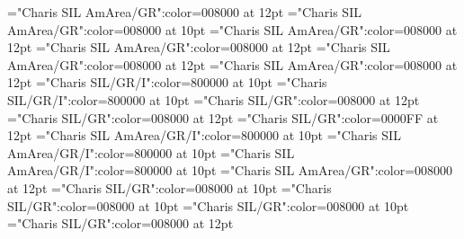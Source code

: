 \documentclass[a4paper,twoside]{article}
\begin{document}
\font\visiblevariantentryrefsminorentryvariantletDatadicBody="Charis SIL AmArea/GR":color=008000 at 12pt
\font\spanvisiblevariantentryrefsminorentryvariantletDatadicBody="Charis SIL AmArea/GR":color=008000 at 10pt
\font\visiblevariantentryrefvisiblevariantentryrefsminorentryvariantletDatadicBody="Charis SIL AmArea/GR":color=008000 at 12pt
\font\variantentrytypesvisiblevariantentryrefvisiblevariantentryrefsminorentryvariantletDatadicBody="Charis SIL AmArea/GR":color=008000 at 12pt
\font\variantentrytypevariantentrytypesvisiblevariantentryrefvisiblevariantentryrefsminorentryvariantletDatadicBody="Charis SIL AmArea/GR":color=008000 at 12pt
\font\reverseabbrvariantentrytypevariantentrytypesvisiblevariantentryrefvisiblevariantentryrefsminorentryvariantletDatadicBody="Charis SIL AmArea/GR":color=008000 at 12pt
\font\spanesreverseabbrvariantentrytypevariantentrytypesvisiblevariantentryrefvisiblevariantentryrefsminorentryvariantletDatadicBody="Charis SIL/GR/I":color=800000 at 10pt
\font\spanreverseabbrvariantentrytypevariantentrytypesvisiblevariantentryrefvisiblevariantentryrefsminorentryvariantletDatadicBody="Charis SIL/GR/I":color=800000 at 10pt
\font{}="Charis SIL/GR":color=008000 at 12pt
\font{}="Charis SIL/GR":color=008000 at 12pt
\font\headwordreferencedentryreferencedentriesvisiblevariantentryrefvisiblevariantentryrefsminorentryvariantletDatadicBody="Charis SIL/GR":color=0000FF at 12pt
\font\spanmxbheadwordreferencedentryreferencedentriesvisiblevariantentryrefvisiblevariantentryrefsminorentryvariantletDatadicBody="Charis SIL AmArea/GR/I":color=800000 at 10pt
\font\spanspanmxbheadwordreferencedentryreferencedentriesvisiblevariantentryrefvisiblevariantentryrefsminorentryvariantletDatadicBody="Charis SIL AmArea/GR/I":color=800000 at 10pt
\font\spanheadwordreferencedentryreferencedentriesvisiblevariantentryrefvisiblevariantentryrefsminorentryvariantletDatadicBody="Charis SIL AmArea/GR/I":color=800000 at 10pt
\font\summarydefinitionminorentryvariantletDatadicBody="Charis SIL AmArea/GR":color=008000 at 12pt
\font\spanessummarydefinitionminorentryvariantletDatadicBody="Charis SIL/GR":color=008000 at 10pt
\font\spanspanessummarydefinitionminorentryvariantletDatadicBody="Charis SIL/GR":color=008000 at 10pt
\font\spansummarydefinitionminorentryvariantletDatadicBody="Charis SIL/GR":color=008000 at 10pt
\font\morphosyntaxanalysissensesensecontentsensesentryletDatadicBody="Charis SIL/GR":color=008000 at 12pt
\end{document}
